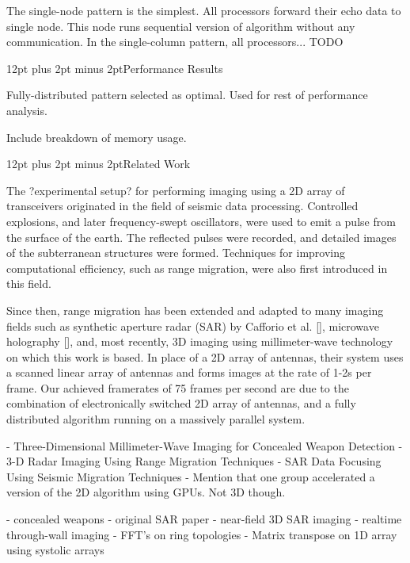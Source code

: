 \documentclass[twocolumn]{article}
\makeatletter
\def\section{\@startsection{section}{1}{\z@}{24pt plus 2 pt
minus 2 pt} {12pt plus 2pt minus 2pt}{\large\bf}}
\makeatother
\begin{document}
The single-node pattern is the simplest. All processors forward their echo data to single node. This node runs sequential version of algorithm without any communication. In the single-column pattern, all processors... TODO

\section{Performance Results}

Fully-distributed pattern selected as optimal. Used for rest of performance analysis.

Include breakdown of memory usage.

\section{Related Work}

The ?experimental setup? for performing imaging using a 2D array of transceivers originated in the field of seismic data processing. Controlled explosions, and later frequency-swept oscillators, were used to emit a pulse from the surface of the earth. The reflected pulses were recorded, and detailed images of the subterranean structures were formed. Techniques for improving computational efficiency, such as range migration, were also first introduced in this field.

Since then, range migration has been extended and adapted to many imaging fields such as synthetic aperture radar (SAR) by Cafforio et al. [], microwave holography [], and, most recently, 3D imaging using millimeter-wave technology on which this work is based. In place of a 2D array of antennas, their system uses a scanned linear array of antennas and forms images at the rate of 1-2s per frame. Our achieved framerates of 75 frames per second are due to the combination of electronically switched 2D array of antennas, and a fully distributed algorithm running on a massively parallel system. 

- Three-Dimensional Millimeter-Wave Imaging for Concealed Weapon Detection
- 3-D Radar Imaging Using Range Migration Techniques
- SAR Data Focusing Using Seismic Migration Techniques
- Mention that one group accelerated a version of the 2D algorithm using GPUs. Not 3D though.

- concealed weapons
- original SAR paper
- near-field 3D SAR imaging
- realtime through-wall imaging
- FFT's on ring topologies
- Matrix transpose on 1D array using systolic arrays \cite{systolic-arrays-transpose}
\end{document}
